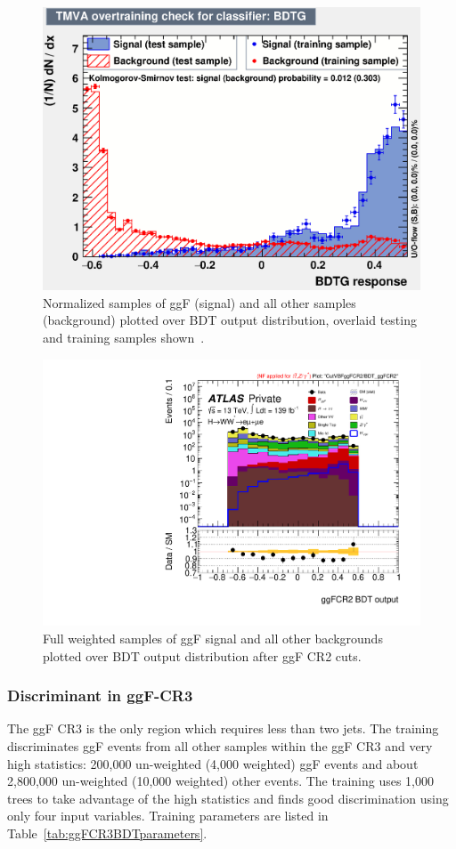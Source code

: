 \begin{figure}[!htbp]
\centering
  \includegraphics[width=.45\linewidth]{Pictures/ggFCR2/overtrain_BDTG.eps}
\caption{Normalized samples of ggF (signal) and all other samples (background) plotted over BDT output distribution, overlaid testing and training samples shown~\cite{ourSupportNote}.}
\label{fig:ggFCR2BDTresult}
\end{figure}

\begin{figure}[!htbp]
\centering
  \includegraphics[width=.45\linewidth]{Pictures/run2-emme-CutVBFggFCR2-BDT_ggFCR2-log.pdf}
\caption{Full weighted samples of ggF signal and all other backgrounds plotted over BDT output distribution after ggF CR2 cuts.}
\label{fig:ggFCR2BDTresult2}
\end{figure}

\newpage

\subsubsection{Discriminant in ggF-CR3}
The ggF CR3 is the only region which requires less than two jets. The training discriminates ggF events from all other samples within the ggF CR3 and very high statistics: 200,000 un-weighted (4,000 weighted) ggF events and about 2,800,000 un-weighted (10,000 weighted) other events. The training uses 1,000 trees to take advantage of the high statistics and finds good discrimination using only four input variables. Training parameters are listed in Table~\ref{tab:ggFCR3BDTparameters}.

